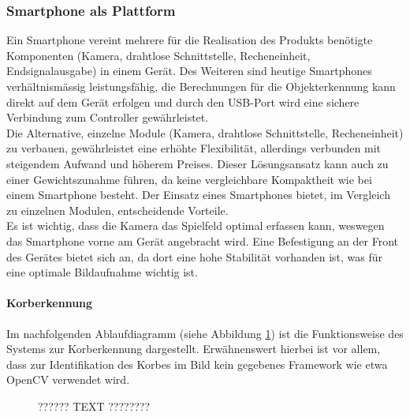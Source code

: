 \subsubsection{Smartphone als Plattform}
	Ein Smartphone vereint mehrere für die Realisation des Produkts benötigte Komponenten (Kamera, drahtlose Schnittstelle, Recheneinheit, Endsignalausgabe) 
	in einem Gerät. Des Weiteren sind heutige Smartphones verhältnismässig leistungsfähig, die Berechnungen für die Objekterkennung 
	kann direkt auf dem Gerät erfolgen und durch den USB-Port wird eine sichere Verbindung zum Controller gewährleistet.\\
	Die Alternative, einzelne Module (Kamera, drahtlose Schnittstelle, Recheneinheit) zu verbauen, 
	gewährleistet eine erhöhte Flexibilität, allerdings verbunden mit steigendem Aufwand und höherem Preises. 
	Dieser Lösungsansatz kann auch zu einer Gewichtszunahme führen, da keine vergleichbare Kompaktheit wie bei einem Smartphone besteht. 
	Der Einsatz eines Smartphones bietet, im Vergleich zu einzelnen Modulen, entscheidende Vorteile.\\
	Es ist wichtig, dass die Kamera das Spielfeld optimal erfassen kann, weswegen das Smartphone vorne am Gerät angebracht wird. 
	Eine Befestigung an der Front des Gerätes bietet sich an, da dort eine hohe Stabilität vorhanden ist, 
	was für eine optimale Bildaufnahme wichtig ist.\\
	
	\paragraph{Korberkennung\\}
	Im nachfolgenden Ablaufdiagramm (siehe Abbildung \ref{fig:Ablaufdiagramm}) ist die Funktionsweise des Systems zur Korberkennung dargestellt. 
	Erwähnenswert hierbei ist vor allem, dass zur Identifikation des Korbes im Bild kein gegebenes Framework wie etwa OpenCV verwendet wird. \\
	
	\begin{figure}[h!]
		\centering
		\caption{?????? TEXT ????????}
		\label{fig:Ablaufdiagramm}
	\end{figure}
	
